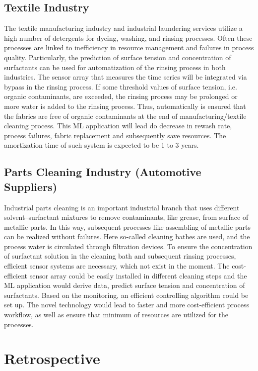 \documentclass{report}
\begin{document}
\section{Textile Industry}
The textile manufacturing industry and industrial laundering services utilize a high number of detergents for dyeing, washing, and rinsing processes. Often these processes are linked to inefficiency in resource management and failures in process quality. Particularly, the prediction of surface tension and concentration of surfactants can be used for automatization of the rinsing process in both industries. The sensor array that measures the time series will be integrated via bypass in the rinsing process. If some threshold values of surface tension, i.e. organic contaminants, are exceeded, the rinsing process may be prolonged or more water is added to the rinsing process. Thus, automatically is ensured that the fabrics are free of organic contaminants at the end of manufacturing/textile cleaning process. This ML application will lead do decrease in rewash rate, process failures, fabric replacement and subsequently save resources. The amortization time of such system is expected to be 1 to 3 years.
\section{Parts Cleaning Industry (Automotive Suppliers)}
Industrial parts cleaning is an important industrial branch that uses different solvent–surfactant mixtures to remove contaminants, like grease, from surface of metallic parts. In this way, subsequent processes like assembling of metallic parts can be realized without failures. Here so-called cleaning bathes are used, and the process water is circulated through filtration devices. To ensure the concentration of surfactant solution in the cleaning bath and subsequent rinsing processes, efficient sensor systems are necessary, which not exist in the moment. The cost-efficient sensor array could be easily installed in different cleaning steps and the ML application would derive data, predict surface tension and concentration of surfactants. Based on the monitoring, an efficient controlling algorithm could be set up. The novel technology would lead to faster and more cost-efficient process workflow, as well as ensure that minimum of resources are utilized for the processes.
\chapter{Retrospective}
\end{document}

